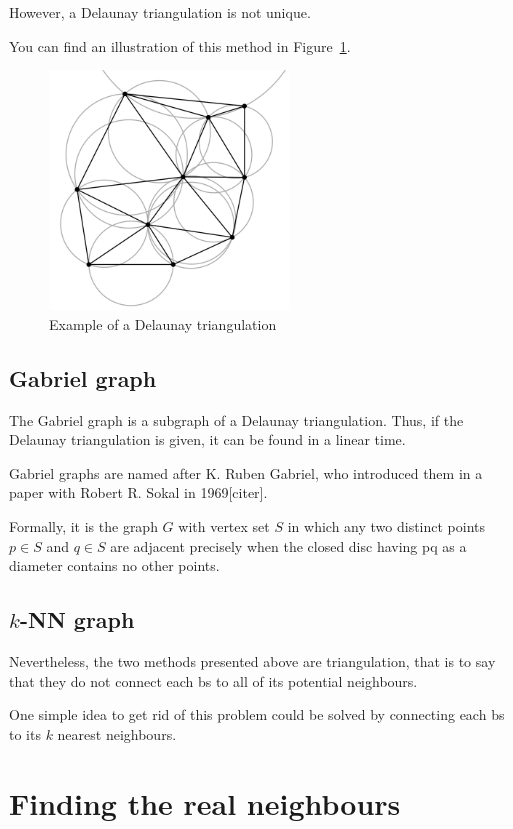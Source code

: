 \documentclass[lettersize,journal,english]{IEEEtran}
\begin{document}
However, a Delaunay triangulation is not unique.

You can find an illustration of this method in Figure~\ref{del_tri}.
\begin{figure}[!t]
    \centering
    \includegraphics[width=2.5in]{images/illus_graphs/Delaunay_circumcircles_vectorial.svg.png}
    \caption{Example of a Delaunay triangulation}
    \label{del_tri}
\end{figure}

\subsection{Gabriel graph}
\noindent The Gabriel graph is a subgraph of a Delaunay triangulation. Thus, if the Delaunay triangulation is given, it can be found in a linear time. 

Gabriel graphs are named after K. Ruben Gabriel, who introduced them in a paper with Robert R. Sokal in 1969[citer].

Formally, it is the graph $G$ with vertex set $S$ in which any two distinct points $p\in S$ and $q\in S$ are adjacent precisely when the closed disc having pq as a diameter contains no other points.

\subsection{$k$-NN graph}
\noindent Nevertheless, the two methods presented above are triangulation, that is to say that they do not connect each \acrshort{bs} to all of its potential neighbours.

One simple idea to get rid of this problem could be solved by connecting each \acrshort{bs} to its $k$ nearest neighbours.

\section{Finding the real neighbours}
\end{document}
